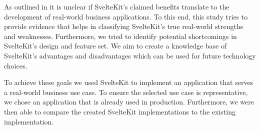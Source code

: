 




As outlined in  it is unclear if SvelteKit's claimed benefits translate to the development of real-world business applications. To this end, this study tries to provide evidence that helps in classifying SvelteKit's true real-world strengths and weaknesses. Furthermore, we tried to identify potential shortcomings in SvelteKit's design and feature set. We aim to create a knowledge base of SvelteKit's advantages and disadvantages which can be used for future technology choices.

To achieve these goals we used SvelteKit to implement an application that serves a real-world business use case. To ensure the selected use case is representative, we chose an application that is already used in production. Furthermore, we were then able to compare the created SvelteKit implementations to the existing implementation.

